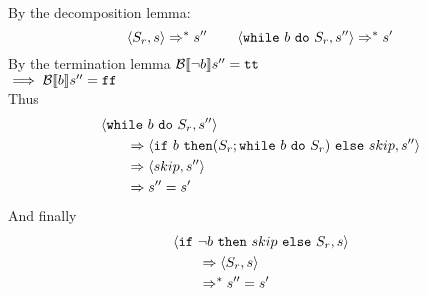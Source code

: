 \begin{exercise}
\begin{itemize}
\begin{itemize}
\begin{align*}
                \end{align*}
                By the decomposition lemma:
                \[ \left<S_r, s\right> \Rightarrow^* s'' \qquad \left<\texttt{while}\ b\ \texttt{do}\ S_r, s''\right> \Rightarrow^* s' \]
                By the termination lemma $\mathcal{B} \llbracket  \neg b \rrbracket s'' = \texttt{tt}$ \\
                $\implies \mathcal{B} \llbracket  b \rrbracket s'' = \texttt{ff}$ \\
                Thus
                \begin{align*}
                    &\instr{\texttt{while}\ b\ \texttt{do}\ S_r}{s''}
                    \\&\qquad\Rightarrow \instr{\texttt{if}\ b\ \texttt{then} (S_r; \texttt{while}\ b\ \texttt{do}\ S_r)\ \texttt{else}\ skip}{s''}
                    \\&\qquad\Rightarrow \instr{skip}{s''}
                    \\&\qquad\Rightarrow s'' = s'
                \end{align*}
                And finally
                \begin{align*}
                    &\instr{\texttt{if}\ \neg b\ \texttt{then}\ skip\ \texttt{else}\ S_r}{s}
                    \\&\qquad\Rightarrow \instr{S_r}{s}
                    \\&\qquad\Rightarrow^* s'' = s'
                \end{align*}
            \end{itemize}
    \end{itemize}
\end{exercise}
